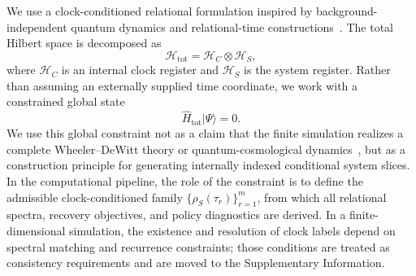 \documentclass{iopjournal}
\begin{document}
We use a clock-conditioned relational formulation inspired by
background-independent quantum dynamics and relational-time
constructions~\cite{Gambini2004RelationalTime,Giovannetti2015QuantumTime,Hoehn2021TrinityRelationalQuantumDynamics}.
The total Hilbert space is decomposed as
\begin{equation}
\mathcal{H}_{\mathrm{tot}}
=
\mathcal{H}_{C}\otimes\mathcal{H}_{S},
\end{equation}
where $\mathcal{H}_{C}$ is an internal clock register and $\mathcal{H}_{S}$ is the
system register. Rather than assuming an externally supplied time coordinate, we
work with a constrained global state
\begin{equation}
\hat{H}_{\mathrm{tot}}|\Psi\rangle=0.
\end{equation}
We use this global constraint not as a claim that the finite simulation realizes a
complete Wheeler--DeWitt theory or quantum-cosmological
dynamics~\cite{Mazzitelli1992Midisuperspace,Massar1999UnitaryNonunitaryEvolution,Maki2026WheelerDeWittSolutions},
but as a construction principle for generating internally indexed conditional
system slices. In the computational pipeline, the
role of the constraint is to define the admissible clock-conditioned family
$\{\rho_S(\tau_r)\}_{r=1}^{m}$, from which all relational spectra, recovery
objectives, and policy diagnostics are derived. In a finite-dimensional
simulation, the existence and resolution of clock labels depend on spectral
matching and recurrence constraints; those conditions are treated as consistency
requirements and are moved to the Supplementary Information.
\end{document}
